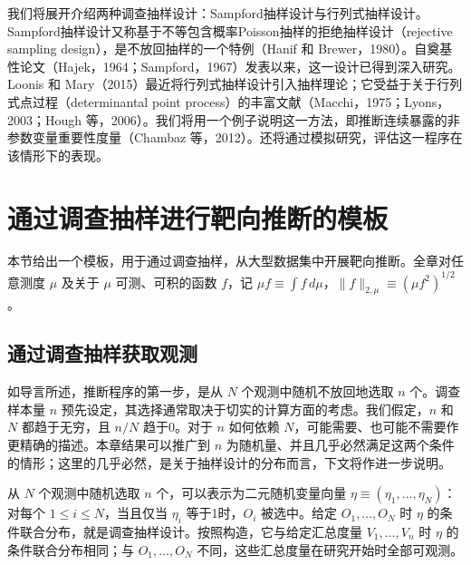 我们将展开介绍两种调查抽样设计：Sampford抽样设计与行列式抽样设计。Sampford抽样设计又称基于不等包含概率Poisson抽样的拒绝抽样设计（rejective sampling design），是不放回抽样的一个特例（Hanif 和 Brewer，1980）。自奠基性论文（Hajek，1964；Sampford，1967）发表以来，这一设计已得到深入研究。Loonis 和 Mary（2015）最近将行列式抽样设计引入抽样理论；它受益于关于行列式点过程（determinantal point process）的丰富文献（Macchi，1975；Lyons，2003；Hough 等，2006）。我们将用一个例子说明这一方法，即推断连续暴露的非参数变量重要性度量（Chambaz 等，2012）。还将通过模拟研究，评估这一程序在该情形下的表现。

\section{通过调查抽样进行靶向推断的模板}

本节给出一个模板，用于通过调查抽样，从大型数据集中开展靶向推断。全章对任意测度 $\mu$ 及关于 $\mu$ 可测、可积的函数 $f$，记 $\mu f\equiv\int f\,d\mu$，$\|f\|_{2,\mu}\equiv(\mu f^2)^{1/2}$。

\subsection{通过调查抽样获取观测}

如导言所述，推断程序的第一步，是从 $N$ 个观测中随机不放回地选取 $n$ 个。调查样本量 $n$ 预先设定，其选择通常取决于切实的计算方面的考虑。我们假定，$n$ 和 $N$ 都趋于无穷，且 $n/N$ 趋于0。对于 $n$ 如何依赖 $N$，可能需要、也可能不需要作更精确的描述。本章结果可以推广到 $n$ 为随机量、并且几乎必然满足这两个条件的情形；这里的几乎必然，是关于抽样设计的分布而言，下文将作进一步说明。

从 $N$ 个观测中随机选取 $n$ 个，可以表示为二元随机变量向量 $\eta\equiv(\eta_1,\ldots,\eta_N)$：对每个 $1\le i\le N$，当且仅当 $\eta_i$ 等于1时，$O_i$ 被选中。给定 $O_1,\ldots,O_N$ 时 $\eta$ 的条件联合分布，就是调查抽样设计。按照构造，它与给定汇总度量 $V_1,\ldots,V_n$ 时 $\eta$ 的条件联合分布相同；与 $O_1,\ldots,O_N$ 不同，这些汇总度量在研究开始时全部可观测。

